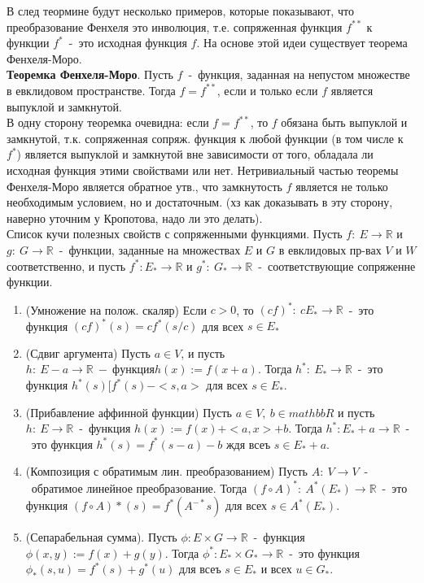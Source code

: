 В след теормине будут несколько примеров, которые показывают, что преобразование Фенхеля это инволюция, т.е. сопряженная функция $f^{**}$ к функции $f^{*}$~-~это исходная функция $f$. На основе этой идеи существует теорема Фенхеля-Моро.\\

\textbf{Теоремка Фенхеля-Моро}. Пусть $f$~-~функция, заданная на непустом множестве в евклидовом пространстве. Тогда $f=f^{**}$, если и только если $f$ является выпуклой и замкнутой.\\

В одну сторону теоремка очевидна: если $f=f^{**}$, то $f$ обязана быть выпуклой и замкнутой, т.к. сопряженная сопряж. функция к любой функции (в том числе к $f^{*}$) является выпуклой и замкнутой вне зависимости от того, обладала ли исходная функция этими свойствами или нет. Нетривиальный частью теоремы Фенхеля-Моро является обратное утв., что замкнутость $f$ является не только необходимым условием, но и достаточным. (хз как доказывать в эту сторону, наверно уточним у Кропотова, надо ли это делать).\\

Список кучи полезных свойств с сопряженными функциями. Пусть $f:~E \to \mathbb{R}$ и $g:~G \to \mathbb{R}$~-~функции, заданные на множествах $E$ и $G$ в евклидовых пр-вах $V$ и $W$ соответственно, и пусть $f^{*}:E_{*} \to \mathbb{R}$ и $g^{*}:~G_{*} \to \mathbb{R}$~-~соответствующие сопряженне функции.\\
\begin{enumerate}
    \item (Умножение на полож. скаляр) Если $c > 0$, то $(cf)^*:~cE_{*} \to \mathbb{R}$~-~это функция $(cf)^*(s)=cf^*(s/c)$ для всех $s \in E_{*}$
    \item (Сдвиг аргумента) Пусть $a \in V$, и пусть $h:~E - a \to \mathbb{R}~-~функция h(x):=f(x+a)$. Тогда $h^*:~E_* \to \mathbb{R}$~-~это функция $h^*(s)[f^*(s)-<s,a>$ для всех $s \in E_*$.
    \item (Прибавление аффинной функции) Пусть $a \in V,~b \in mathbb{R}$ и пусть $h:~E \to \mathbb{R}$~-~функция $h(x):=f(x)+<a,x>+b$. Тогда $h^*:E_*+a \to \mathbb{R}$~-~это функция $h^*(s)=f^*(s-a)-b$ ждя всеъ $s \in E_* + a$.
    \item (Композиция с обратимым лин. преобразованием) Пусть $A:~V \to V$~-~обратимое линейное преобразование. Тогда $(f \circ A)^*:~A^*(E_*) \to \mathbb{R}$~-~это функция $(f \circ A)*(s)=f^*(A^{-*}s)$ для всех $s \in A^*(E_*)$.
    \item (Сепарабельная сумма). Пусть $\phi:E \times G \to \mathbb{R}$~-~функция $\phi(x,y):=f(x)+g(y)$. Тогда $\phi^*:E_* \times G_* \to \mathbb{R}$~-~это функция $\phi_*(s,u)=f^*(s)+g^*(u)$ для всеъ $s \in E_*$ и всех $u \in G_*$.
\end{enumerate}

